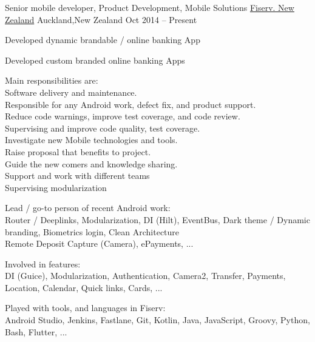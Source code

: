 
\begin{cventries}
	\cventry
	{Senior mobile developer, Product Development, Mobile Solutions}
	{\href{https://www.careers.fiserv.com/new-zealand}{Fiserv. New Zealand}}
	{Auckland,\enskip New Zealand}
	{Oct 2014 – Present}
	{
		\begin{cvitems}
			\item {Developed dynamic brandable \href{https://play.google.com/store/apps/details?id=com.fiserv.touchbankingasp&hl=en}{\color{deepblue}{Android}}/\href{https://itunes.apple.com/us/app/touchbanking/id386678211?mt=8}{\color{deepblue}{iPhone}} online banking App}
			\item {Developed custom branded online banking Apps}
			\item 
			{Main responsibilities are: 
				\\\tab * Software delivery and maintenance.
				\\\tab * Responsible for any Android work, defect fix, and product support.
				\\\tab * Reduce code warnings, improve test coverage, and code review.
				\\\tab * Supervising and improve code quality, test coverage.
				\\\tab * Investigate new Mobile technologies and tools.
				\\\tab * Raise proposal that benefits to project.
				\\\tab * Guide the new comers and knowledge sharing.
				\\\tab * Support and work with different teams
				\\\tab * Supervising modularization
			}
			\item {Lead / go-to person of recent Android work: 
				\\\tab Router / Deeplinks, Modularization, DI (Hilt), EventBus, Dark theme / Dynamic branding, Biometrics login, Clean Architecture
				\\\tab Remote Deposit Capture (Camera), ePayments, ...}
			\item {Involved in features: 
				\\\tab DI (Guice), Modularization, Authentication, Camera2, Transfer, Payments, Location, Calendar, Quick links, Cards, ...}
			\item {Played with tools, and languages in Fiserv: 
				\\\tab Android Studio, Jenkins, Fastlane, Git, Kotlin, Java, JavaScript, Groovy, Python, Bash, Flutter, ...}
		\end{cvitems}
	}
\end{cventries}

